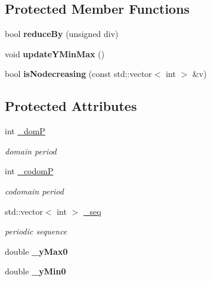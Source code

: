 \subsection*{Protected Member Functions}
\begin{DoxyCompactItemize}
\item 
\mbox{\label{classetvo_i_i_1_1_fper_a442c2aeb214f649d0d1a5cc6f9f8eff8}} 
bool {\bfseries reduce\+By} (unsigned div)
\item 
\mbox{\label{classetvo_i_i_1_1_fper_a9b2bbafd6eb1722784cc932b70bf3b28}} 
void {\bfseries update\+Y\+Min\+Max} ()
\item 
\mbox{\label{classetvo_i_i_1_1_fper_ae9387c054387c3852491a3d8636f4841}} 
bool {\bfseries is\+Nodecreasing} (const std\+::vector$<$ int $>$ \&v)
\end{DoxyCompactItemize}
\subsection*{Protected Attributes}
\begin{DoxyCompactItemize}
\item 
\mbox{\label{classetvo_i_i_1_1_fper_a4f511021c57a8955089044c070eff53b}} 
int \mbox{\hyperlink{classetvo_i_i_1_1_fper_a4f511021c57a8955089044c070eff53b}{\+\_\+domP}}
\begin{DoxyCompactList}\small\item\em domain period \end{DoxyCompactList}\item 
\mbox{\label{classetvo_i_i_1_1_fper_aa2db188ba83709c6b157d71ba743eeef}} 
int \mbox{\hyperlink{classetvo_i_i_1_1_fper_aa2db188ba83709c6b157d71ba743eeef}{\+\_\+codomP}}
\begin{DoxyCompactList}\small\item\em codomain period \end{DoxyCompactList}\item 
\mbox{\label{classetvo_i_i_1_1_fper_a3f1bfabe5d0b91026bf3c33337039a3b}} 
std\+::vector$<$ int $>$ \mbox{\hyperlink{classetvo_i_i_1_1_fper_a3f1bfabe5d0b91026bf3c33337039a3b}{\+\_\+seq}}
\begin{DoxyCompactList}\small\item\em periodic sequence \end{DoxyCompactList}\item 
\mbox{\label{classetvo_i_i_1_1_fper_ad1df24bbefd1f6e52927fcd7438a9f1f}} 
double {\bfseries \+\_\+y\+Max0}
\item 
\mbox{\label{classetvo_i_i_1_1_fper_aee4624c091121368e819e8a112babecb}} 
double {\bfseries \+\_\+y\+Min0}
\end{DoxyCompactItemize}
